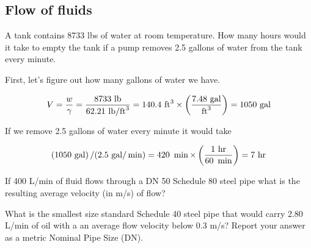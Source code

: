 \documentclass[multi,preview,varwidth=false,border=5,12pt]{standalone}
\begin{document}
\begin{center}
\section*{Flow of fluids}
\end{center}

\begin{question}

A tank contains 8733 lbs of water at room temperature. How many hours would it take to empty the tank if a pump removes 2.5 gallons of water from the tank every minute.

\begin{solution}

First, let's figure out how many gallons of water we have.

\begin{align*}
    V=\frac{w}{\gamma}=\frac{8733~\mathrm{lb}}{62.21~\mathrm{lb}/\mathrm{ft}^3}=140.4~\mathrm{ft}^3\times\left(\frac{7.48~\mathrm{gal}}{\mathrm{ft}^3}\right)=1050~\mathrm{gal}
\end{align*}

If we remove 2.5 gallons of water every minute it would take

\begin{align*}
    \left(1050~\mathrm{gal}\right)/(2.5~\mathrm{gal}/\min) = 420 ~\min \times \left(\frac{1~\mathrm{hr}}{60~\min}\right)=7~\mathrm{hr}
\end{align*}

\end{solution}

\end{question}


\begin{question}

If 400 L/min of fluid flows through a DN 50 Schedule 80 steel pipe what is the resulting average velocity (in m/s) of flow?

\begin{solution}
\end{solution}

\end{question}


\begin{question}

What is the smallest size standard Schedule 40 steel pipe that would carry 2.80 L/min of oil with a an average flow velocity below 0.3 m/s?  Report your answer as a metric Nominal Pipe Size (DN).

\begin{solution}
\end{solution}

\end{question}
\end{document}
